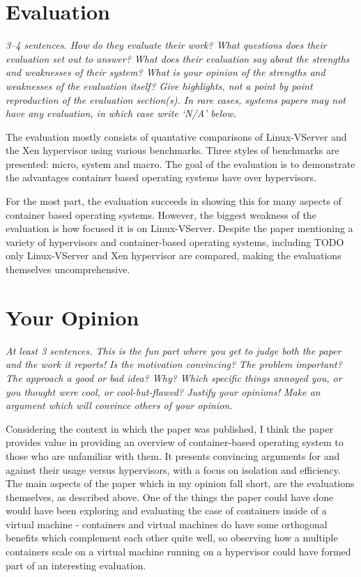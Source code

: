 \documentclass[11pt]{article}
\begin{document}
\section*{Evaluation}

\textsl{3--4 sentences. How do they evaluate their work? What questions does
their evaluation set out to answer? What does their evaluation say about the
strengths and weaknesses of their system? What is your opinion of the strengths
and weaknesses of the evaluation itself? Give highlights, not a point by point
reproduction of the evaluation section(s). In rare cases, systems papers may
not have any evaluation, in which case write `N/A' below.}

The evaluation mostly consists of quantative comparisons of Linux-VServer and
the Xen hypervisor using various benchmarks. Three styles of benchmarks are
presented: micro, system and macro. The goal of the evaluation is to demonstrate
the advantages container based operating systems have over hypervisors.

For the most part, the evaluation succeeds in showing this for many aspects of
container based operating systems. However, the biggest weakness of the
evaluation is how focused it is on Linux-VServer. Despite the paper mentioning
a variety of hypervisors and container-based operating systems, including TODO
only Linux-VServer and Xen hypervisor are compared, making the evaluations
themselves uncomprehensive.

\section*{Your Opinion}

\textsl{At least 3 sentences. This is the fun part where you get to judge both
the paper and the work it reports! Is the motivation convincing? The problem
important? The approach a good or bad idea? Why? Which specific things annoyed
you, or you thought were cool, or cool-but-flawed? Justify your opinions! Make
an argument which will convince others of your opinion.}

Considering the context in which the paper was published, I think the paper
provides value in providing an overview of container-based operating system to
those who are unfamiliar with them. It presents convincing arguments for and
against their usage versus hypervisors, with a focus on isolation and
efficiency. The main aspects of the paper which in my opinion fall short, are
the evaluations themselves, as described above. One of the things the paper
could have done would have been exploring and evaluating the case of containers
inside of a virtual machine - containers and virtual machines do have some
orthogonal benefits which complement each other quite well, so observing how a
multiple containers scale on a virtual machine running on a hypervisor could
have formed part of an interesting evaluation.
\end{document}
